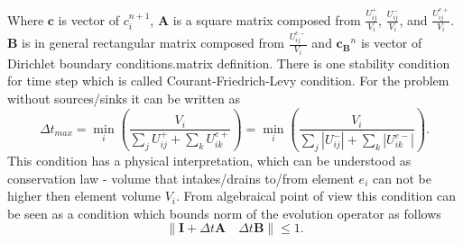   Where $\mathbf{c}$ is vector of $c_i^{n+1}$, $\mathbf{A}$ is a square matrix composed from $\frac{U_{ij}^{+}}{V_i}$, $\frac{U_{ij}^{-}}{V_i}$, and
  $\frac{U_{ij}^{e+}}{V_i}$. $\mathbf{B}$ is in general rectangular matrix composed from $\frac{U_{ij}^{e-}}{V_i}$ and $\mathbf{c_{B}}^{n}$ is  vector of Dirichlet
  boundary conditions.matrix definition. There is one stability condition for time step which is called Courant-Friedrich-Levy condition. 
  For the problem without sources/sinks it can be written as
  \begin{equation}
  \Delta t_{max} = \min_i \left( \frac{V_i}{ \sum\limits_{j}  U_{ij}^{+} + \sum\limits_{k}  U_{ik}^{e+} } \right) =
  \min_i \left( \frac{V_i}{ \sum\limits_{j} | U_{ij}^{-} | + \sum\limits_{k} | U_{ik}^{e-} | } \right). \label{cfl} 
  \end{equation}
  This condition has a physical interpretation, which can be understood as conservation law - volume that intakes/drains to/from element $e_i$ 
can not be higher then element volume $V_i$. From algebraical point of view this condition can be seen as a condition which bounds norm of the evolution operator as follows 
  \begin{equation}
  \| \mathbf{I} + \Delta t \mathbf{A} \quad \Delta t \mathbf{B} \| \le 1.
  \end{equation}
